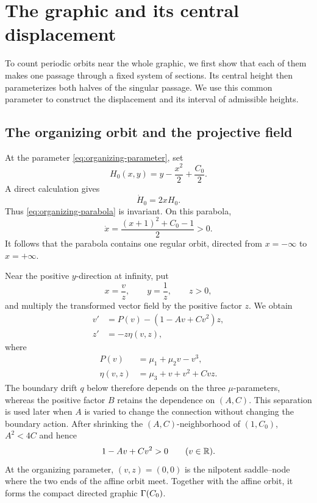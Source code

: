 \section{The graphic and its central displacement}
\label{sec:graphic-central-return}

To count periodic orbits near the whole graphic, we first show that each
of them makes one passage through a fixed system of sections. Its central
height then parameterizes both halves of the singular passage. We use
this common parameter to construct the displacement and its interval of
admissible heights.

\subsection{The organizing orbit and the projective field}

At the parameter \eqref{eq:organizing-parameter}, set
\[
 H_0(x,y)=y-\frac{x^2}{2}+\frac{C_0}{2}.
\]
A direct calculation gives
\begin{equation}
\label{eq:parabola-invariance-new}
 \dot H_0=2xH_0.
\end{equation}
Thus \eqref{eq:organizing-parabola} is invariant.  On this parabola,
\begin{equation}
\label{eq:parabola-speed-new}
 \dot x=\frac{(x+1)^2+C_0-1}{2}>0.
\end{equation}
It follows that the parabola contains one regular orbit, directed from
$x=-\infty$ to $x=+\infty$.

Near the positive $y$-direction at infinity, put
\begin{equation}
\label{eq:projective-coordinates-new}
 x=\frac vz,\qquad y=\frac1z,\qquad z>0,
\end{equation}
and multiply the transformed vector field by the positive factor $z$.  We
obtain
\begin{equation}
\label{eq:projective-family-new}
\begin{aligned}
 v'&=P(v)-(1-Av+Cv^2)z,\\
 z'&=-z\eta(v,z),
\end{aligned}
\end{equation}
where
\begin{equation}
\label{eq:projective-factors-new}
\begin{aligned}
 P(v)&=\mu _1+\mu _2v-v^3,\\
 \eta(v,z)&=\mu _3+v+v^2+Cvz.
\end{aligned}
\end{equation}
The boundary drift \(q\) below therefore depends on the three
\(\mu\)-parameters, whereas the positive factor \(B\) retains the
dependence on \((A,C)\). This separation is used later when \(A\) is
varied to change the connection without changing the boundary action.
After shrinking the $(A,C)$-neighborhood of $(1,C_0)$,
$A^2<4C$ and hence
\begin{equation}
\label{eq:K-positive-new}
 1-Av+Cv^2>0\qquad(v\in\mathbb R).
\end{equation}
At the organizing parameter, $(v,z)=(0,0)$ is the nilpotent saddle--node
where the two ends of the affine orbit meet. Together with the affine
orbit, it forms the compact directed graphic $\Gamma(C_0)$.

